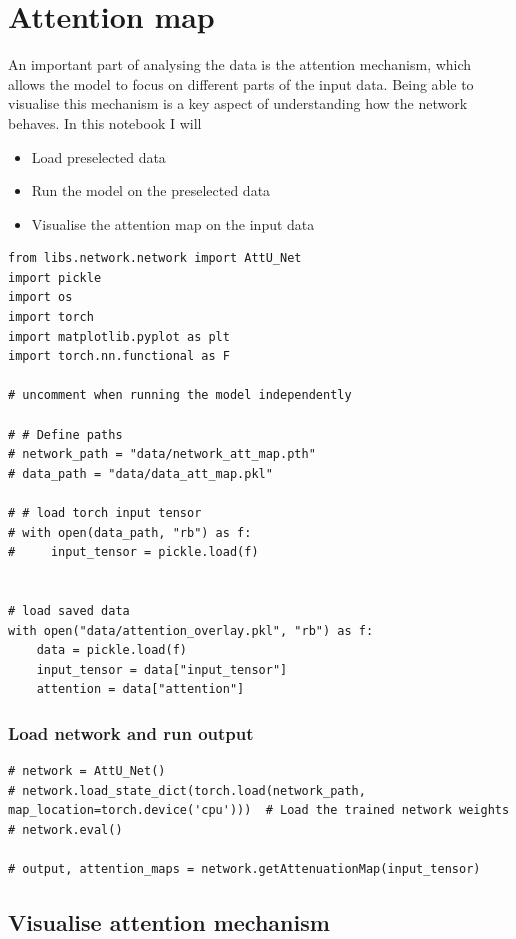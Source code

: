 \section{Attention map}

An important part of analysing the data is the attention mechanism, which allows the model to focus on different parts of the input data. Being able to visualise this mechanism is a key aspect of understanding how the network behaves. In this notebook I will

\begin{itemize}
\item Load preselected data
\item Run the model on the preselected data
\item Visualise the attention map on the input data
\end{itemize}

\begin{verbatim}
from libs.network.network import AttU_Net
import pickle
import os
import torch
import matplotlib.pyplot as plt
import torch.nn.functional as F

# uncomment when running the model independently

# # Define paths
# network_path = "data/network_att_map.pth"
# data_path = "data/data_att_map.pkl"

# # load torch input tensor
# with open(data_path, "rb") as f:
#     input_tensor = pickle.load(f)


# load saved data
with open("data/attention_overlay.pkl", "rb") as f:
    data = pickle.load(f)
    input_tensor = data["input_tensor"]
    attention = data["attention"]
\end{verbatim}

\subsubsection{Load network and run output}

\begin{verbatim}
# network = AttU_Net()
# network.load_state_dict(torch.load(network_path, map_location=torch.device('cpu')))  # Load the trained network weights
# network.eval()

# output, attention_maps = network.getAttenuationMap(input_tensor)
\end{verbatim}

\subsection{Visualise attention mechanism}

